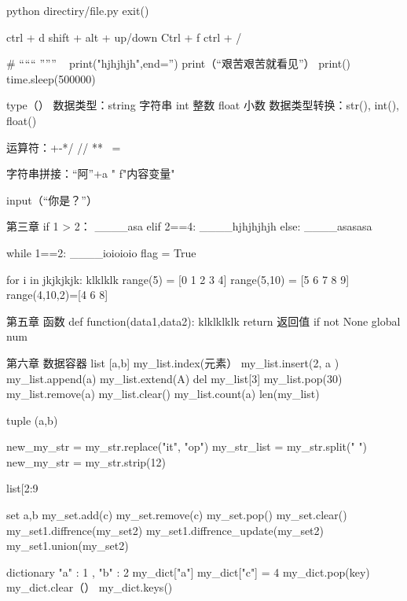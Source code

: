 python directiry/file.py %
exit()  %

ctrl + d %
shift + alt + up/down %
Ctrl + f %
ctrl + / %

#  %
“““     ”””   %
\ %
print("hjhjhjh",end='')  %
print（“艰苦艰苦就看见”）  %
print()  %
time.sleep(500000) %

type（）  %
数据类型：string 字符串
          int    整数
          float  小数
数据类型转换：str(), int(), float()

运算符：+-*/  // %
              ** %
              ~= %

字符串拼接：“阿”+a 
            "  %
            f"内容{变量}"   %

input（“你是？”）  %


第三章
if 1 > 2：
____asa
elif 2==4:
____hjhjhjhjh
else:
____asasasa

while 1==2:
____ioioioio
flag = True

for i in jkjkjkjk:
    klklklk
range(5) = [0 1 2 3 4]
range(5,10) = [5 6 7 8 9]
range(4,10,2)=[4 6 8]

第五章 函数
def function(data1,data2):
    klklklklk
    return 返回值
if not None %
global num  %

第六章  数据容器
list  [a,b]
my_list.index(元素） %
my_list.insert(2, a )  %
my_list.append(a)  %
my_list.extend(A)  %
del my_list[3]    %
my_list.pop(30)   %
my_list.remove(a)   %
my_list.clear()   %
my_list.count(a)   %
len(my_list)    %

tuple (a,b)  %

new_my_str = my_str.replace("it", "op")  %
my_str_list = my_str.split(" ")  %
new_my_str = my_str.strip(12)  %

list[2:9%

set {a,b}  %
my_set.add(c)  %
my_set.remove(c)  %
my_set.pop()  %
my_set.clear()  %
my_set1.diffrence(my_set2) %
my_set1.diffrence_update(my_set2) %
my_set1.union(my_set2) %

dictionary  {"a" : 1 , "b" : 2}  %
my_dict["a"] %
my_dict["c"] = 4  %
my_dict.pop(key)  %
my_dict.clear（）
my_dict.keys()  %

